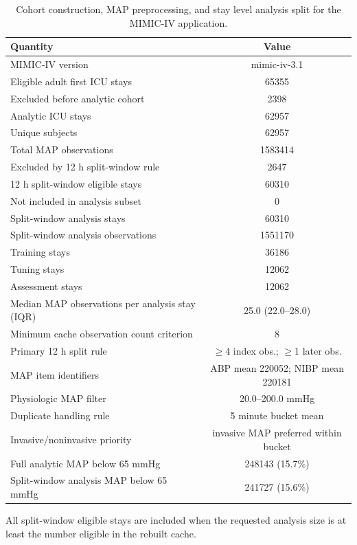 \begin{table}[!htbp]
\caption{Cohort construction, MAP preprocessing, and stay level analysis split for the MIMIC-IV application.}
\label{tab:app_cohort}
\centering
\begin{tabular}{lc}
\hline
Quantity & Value\\
\hline
MIMIC-IV version & mimic-iv-3.1\\
Eligible adult first ICU stays & 65355\\
Excluded before analytic cohort & 2398\\
Analytic ICU stays & 62957\\
Unique subjects & 62957\\
Total MAP observations & 1583414\\
Excluded by 12 h split-window rule & 2647\\
12 h split-window eligible stays & 60310\\
Not included in analysis subset & 0\\
Split-window analysis stays & 60310\\
Split-window analysis observations & 1551170\\
Training stays & 36186\\
Tuning stays & 12062\\
Assessment stays & 12062\\
Median MAP observations per analysis stay (IQR) & 25.0 (22.0--28.0)\\
Minimum cache observation count criterion & 8\\
Primary 12 h split rule & $\ge$4 index obs.; $\ge$1 later obs.\\
MAP item identifiers & ABP mean 220052; NIBP mean 220181\\
Physiologic MAP filter & 20.0--200.0 mmHg\\
Duplicate handling rule & 5 minute bucket mean\\
Invasive/noninvasive priority & invasive MAP preferred within bucket\\
Full analytic MAP below 65 mmHg & 248143 (15.7\%)\\
Split-window analysis MAP below 65 mmHg & 241727 (15.6\%)\\
\hline
\end{tabular}
\par\smallskip
\footnotesize{All split-window eligible stays are included when the requested analysis size is at least the number eligible in the rebuilt cache.}
\end{table}
